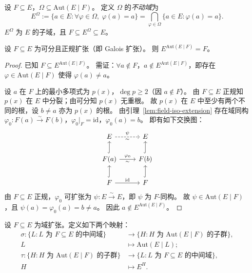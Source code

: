 \documentclass[lang=cn,a4paper,newtx]{elegantbook}
\begin{document}
\begin{definition}[不动域]
  设 $F\subseteq E$，$\Omega\subseteq\mathrm{Aut}(E\mid F)$。
  定义 $\Omega$ 的\emph{不动域}为
  \[
    E^{\Omega}:=\{a\in E:\forall\varphi\in\Omega,\;\varphi(a)=a\}=\bigcap_{\varphi\in\Omega}\{a\in E:\varphi(a)=a\}.
  \]
  $E^{\Omega}$ 为 $E$ 的子域，且 $F\subseteq E^{\Omega}\subseteq E$。
\end{definition}

\begin{lemma}\label{galois-fixed-field}
  设 $F\subseteq E$ 为可分且正规扩张（即 Galois 扩张）。
  则 $E^{\mathrm{Aut}(E\mid F)}=F$。
\end{lemma}

\begin{proof}
  已知 $F\subseteq E^{\mathrm{Aut}(E\mid F)}$。
  需证：$\forall a\notin F$，$a\notin E^{\mathrm{Aut}(E\mid F)}$，即存在 $\varphi\in\mathrm{Aut}(E\mid F)$ 使得 $\varphi(a)\ne a$。

  设 $a$ 在 $F$ 上的最小多项式为 $p(x)$，$\deg p\ge 2$（因 $a\notin F$）。
  由 $F\subseteq E$ 正规知 $p(x)$ 在 $E$ 中分裂；由可分知 $p(x)$ 无重根。
  故 $p(x)$ 在 $E$ 中至少有两个不同的根，设 $b\ne a$ 亦为 $p(x)$ 的根。
  由引理~\ref{lem:field-iso-extension} 存在域同构 $\varphi_0\colon F(a)\xrightarrow{\sim} F(b)$，$\varphi_0\big|_F=\mathrm{id}$，$\varphi_0(a)=b$。
  即有如下交换图：
  \[
    \begin{tikzcd}
      E \arrow[r,dashed,"\psi","\sim"'] & E \\
      F(a) \arrow[u,hook] \arrow[r,"\varphi_0","\sim"'] & F(b) \arrow[u,hook] \\
      F \arrow[u,hook] \arrow[r,"\mathrm{id}"] & F \arrow[u,hook]
    \end{tikzcd}
  \]
  由 $F\subseteq E$ 正规，$\varphi_0$ 可扩张为 $\psi\colon E\xrightarrow{\sim} E$，即 $\psi$ 为 $F$-同构。
  故 $\psi\in\mathrm{Aut}(E\mid F)$，且 $\psi(a)=\varphi_0(a)=b\ne a$。
  因此 $a\notin E^{\mathrm{Aut}(E\mid F)}$。
\end{proof}

\begin{definition}[Galois 对应]
  设 $F\subseteq E$ 为域扩张。定义如下两个映射：
  \begin{align*}
    \sigma\colon\{L:L\text{ 为 }F\subseteq E\text{ 的中间域}\}&\to\{H:H\text{ 为 }\mathrm{Aut}(E\mid F)\text{ 的子群}\},\\
    L&\mapsto\mathrm{Aut}(E\mid L);\\[6pt]
    \tau\colon\{H:H\text{ 为 }\mathrm{Aut}(E\mid F)\text{ 的子群}\}&\to\{L:L\text{ 为 }F\subseteq E\text{ 的中间域}\},\\
    H&\mapsto E^H.
  \end{align*}
\end{definition}
\end{document}
